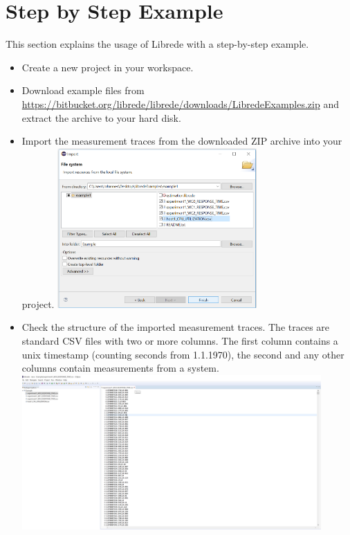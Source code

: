 \section{Step by Step Example}

This section explains the usage of Librede with a step-by-step example.

\begin{itemize}
	\item Create a new project in your workspace.
	\item Download example files from \url{https://bitbucket.org/librede/librede/downloads/LibredeExamples.zip} and extract the archive to your hard disk.	
	\item Import the measurement traces from the downloaded ZIP archive into your project. \newline
			\newline
			\includegraphics[width=0.6\textwidth]{screenshots/Screenshot9} \newline
	\item Check the structure of the imported measurement traces. The traces are standard CSV files with two or more columns. The first column contains a unix timestamp (counting seconds from 1.1.1970), the second and any other columns contain measurements from a system.
	\newline \newline
			\includegraphics[width=0.9\textwidth]{screenshots/Screenshot10} \newline \newline

\end{itemize}
